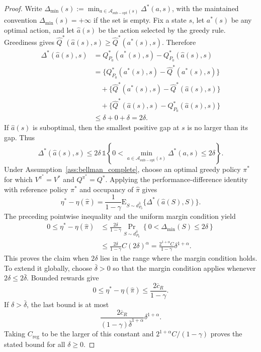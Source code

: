 \documentclass[12pt]{article}
\theoremstyle{remark}\newtheorem{remark}[theorem]{Remark}\theoremstyle{plain}
\newcommand{\E}{\mathrm{E}}
\begin{document}
\begin{proof}
    Write
    $\Delta_{\min}(s):=
      \min_{a\in\mathcal A_{\mathrm{sub-opt}}(s)}
      \Delta^*(a,s)$, with the maintained convention
    $\Delta_{\min}(s)=+\infty$ if the set is empty.
    Fix a state $s$, let $a^*(s)$ be any optimal action, and let
    $\widehat a(s)$ be the action selected by the greedy rule.
    Greediness gives
    $\widehat Q^*(\widehat a(s),s)
      \geq\widehat Q^*(a^*(s),s)$.  Therefore
    \[
        \begin{aligned}
        \Delta^*(\widehat a(s),s)
        &=Q_{P_0}^*(a^*(s),s)
          -Q_{P_0}^*(\widehat a(s),s)\\
        &=
        \{Q_{P_0}^*(a^*(s),s)
          -\widehat Q^*(a^*(s),s)\}\\
        &\quad+
        \{\widehat Q^*(a^*(s),s)
          -\widehat Q^*(\widehat a(s),s)\}\\
        &\quad+
        \{\widehat Q^*(\widehat a(s),s)
          -Q_{P_0}^*(\widehat a(s),s)\}\\
        &\leq\delta+0+\delta=2\delta.
        \end{aligned}
    \]
    If $\widehat a(s)$ is suboptimal, then the smallest positive gap
    at $s$ is no larger than its gap.  Thus
    \[
        \Delta^*(\widehat a(s),s)
        \leq
        2\delta\,
        \mathds{1}\!\left\{
        0<
        \min_{a\in\mathcal A_{\mathrm{sub-opt}}(s)}
        \Delta^*(a,s)
        \leq2\delta\right\}.
    \]
    Under Assumption~\ref{ass:bellman_complete}, choose an optimal
    greedy policy $\pi^*$ for which
    $V^{\pi^*}=V^*$ and $Q^{\pi^*}=Q^*$.  Applying the
    performance-difference identity with reference policy $\pi^*$
    and occupancy of $\widehat\pi$ gives
    \[
        \eta^*-\eta(\widehat\pi)
        =
        \frac1{1-\gamma}
        \E_{S\sim d_{P_0}^{\widehat\pi}}
        \{\Delta^*(\widehat a(S),S)\}.
    \]
    The preceding pointwise inequality and the uniform margin
    condition yield
    \[
        \begin{aligned}
        0\leq\eta^*-\eta(\widehat\pi)
        &\leq
        \frac{2\delta}{1-\gamma}
        \Pr_{S\sim d_{P_0}^{\widehat\pi}}
        \left\{0<\Delta_{\min}(S)\leq2\delta\right\}\\
        &\leq
        \frac{2\delta}{1-\gamma}C(2\delta)^\alpha
        =\frac{2^{1+\alpha}C}{1-\gamma}
        \delta^{1+\alpha}.
        \end{aligned}
    \]
    This proves the claim when $2\delta$ lies in the range where the
    margin condition holds.  To extend it globally, choose
    $\bar\delta>0$ so that the margin condition applies whenever
    $2\delta\leq2\bar\delta$.  Bounded rewards give
    \[
        0\leq\eta^*-\eta(\widehat\pi)
        \leq\frac{2\overline c_R}{1-\gamma}.
    \]
    If $\delta>\bar\delta$, the last bound is at most
    \[
        \frac{2\overline c_R}
        {(1-\gamma)\bar\delta^{1+\alpha}}
        \delta^{1+\alpha}.
    \]
    Taking $C_{\mathrm{reg}}$ to be the larger of this constant and
    $2^{1+\alpha}C/(1-\gamma)$ proves the stated bound for all
    $\delta\geq0$.
\end{proof}
\end{document}
